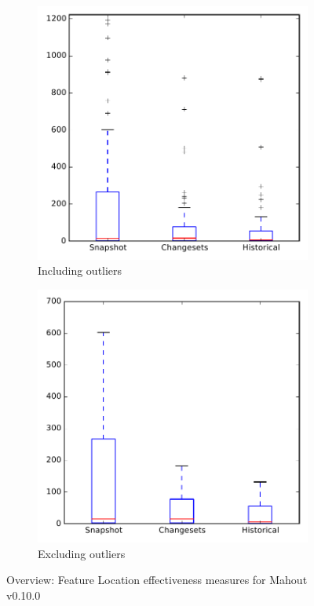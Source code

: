 
\begin{figure}
    \centering
    \begin{subfigure}{.4\textwidth}
        \centering
        \includegraphics[height=0.4\textheight]{figures/flt/all_mahout}
        \caption{Including outliers}\label{fig:flt:all:mahout_outlier}
    \end{subfigure}%
    \begin{subfigure}{.4\textwidth}
        \centering
        \includegraphics[height=0.4\textheight]{figures/flt/all_mahout_no_outlier}
        \caption{Excluding outliers}\label{fig:flt:all:mahout_no_outlier}
    \end{subfigure}
\caption{Overview: Feature Location effectiveness measures for Mahout v0.10.0}
\label{fig:flt:all:mahout}
\end{figure}
